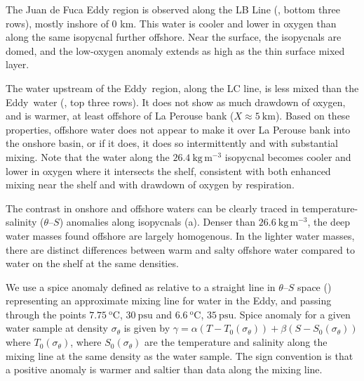 \documentclass[draft]{agujournal2019}
\newcommand*{\Eddy}{{\sc Eddy}}
\begin{document}
The Juan de Fuca Eddy region is observed along the LB Line (, bottom three rows), mostly inshore of 0 km. This water is cooler and lower in oxygen than along the same isopycnal further offshore.  Near the surface, the isopycnals are domed, and the low-oxygen anomaly extends as high as the thin surface mixed layer.

The water upstream of the \Eddy\ region, along the LC line, is less mixed than the \Eddy\ water (, top three rows).  It does not show as much drawdown of oxygen, and is warmer, at least offshore of La Perouse bank ($X \approx 5\ \mathrm{km}$).  Based on these properties, offshore water does not appear to make it over La Perouse bank into the onshore basin, or if it does, it does so intermittently and with substantial mixing. Note that the water along the $26.4\ \mathrm{kg\,m^{-3}}$ isopycnal becomes cooler and lower in oxygen where it intersects the shelf, consistent with both enhanced mixing near the shelf and with drawdown of oxygen by respiration.

The contrast in onshore and offshore waters can be clearly traced in temperature-salinity ($\theta$--$S$) anomalies along isopycnals (a).  Denser than $26.6\ \mathrm{kg\,m^{-3}}$, the deep water masses found offshore are largely homogenous. In the lighter water masses, there are distinct differences between warm and salty offshore water compared to water on the shelf at the same densities.

We use a spice anomaly defined as relative to a straight line in $\theta$--$S$ space () representing an approximate mixing line for water in the \Eddy, and passing through the points $7.75\ \mathrm{^oC}$, $30\ \mathrm{psu}$ and $6.6\ \mathrm{^oC}$, $35\ \mathrm{psu}$. Spice anomaly for a given water sample at density $\sigma_{\theta}$ is given by $\gamma = \alpha \left(T - T_0\left(\sigma_{\theta}\right)\right) + \beta \left(S - S_0\left(\sigma_{\theta}\right)\right)$ where $T_0\left(\sigma_{\theta}\right)$, where $S_0\left(\sigma_{\theta}\right)$ are the temperature and salinity along the mixing line at the same density as the water sample. The sign convention is that a positive anomaly is warmer and saltier than data along the mixing line.
\end{document}
